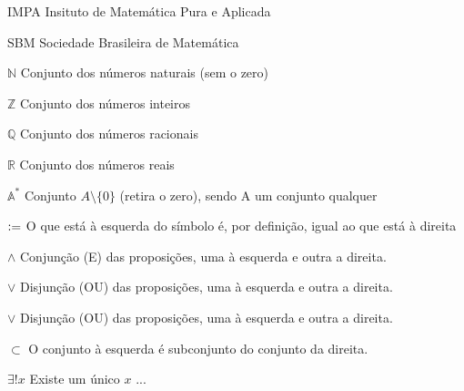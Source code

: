 \documentclass[../main.tex]{subfiles}
\begin{document}
\renewcommand\listadesiglasname{{\fontsize{12pt}{\baselineskip}\normalfont \bfseries LISTA DE ABREVIATURAS E SIGLAS}}
\begin{siglas}
  \item[IMPA]  Insituto de Matemática Pura e Aplicada 
  \item[SBM]  Sociedade Brasileira de Matemática

  \end{siglas}


\renewcommand\listadesimbolosname{{\fontsize{12pt}{\baselineskip}\normalfont \bfseries LISTA DE SÍMBOLOS}}
\begin{simbolos}
  \item[$ \mathbb{N} $] Conjunto dos números naturais (sem o zero)
  \item[$ \mathbb{Z} $] Conjunto dos números inteiros 
  \item[$ \mathbb{Q} $] Conjunto dos números racionais 
  \item[$ \mathbb{R} $] Conjunto dos números reais
  \item[$\mathbb{A^*}$] Conjunto $A \setminus \{0\}$ (retira o zero), sendo A um conjunto qualquer
  \item[$\vcentcolon=$] O que está à esquerda do símbolo é, por definição, igual ao que está à direita
  \item[$\land$] Conjunção (E) das proposições, uma à esquerda e outra a direita. 
  \item[$\lor$] Disjunção (OU) das proposições, uma à esquerda e outra a direita. 
  \item[$\lor$] Disjunção (OU) das proposições, uma à esquerda e outra a direita. 
  \item[$\subset$] O conjunto à esquerda é subconjunto do conjunto da direita. 
  \item[$\exists!x$] Existe um único $x$ ...
  
\end{simbolos}


\renewcommand\contentsname{{\fontsize{12pt}{\baselineskip}\normalfont \bfseries SUMÁRIO}}
\pdfbookmark[0]{\contentsname}{toc}
\tableofcontents*
\cleardoublepage
\end{document}

